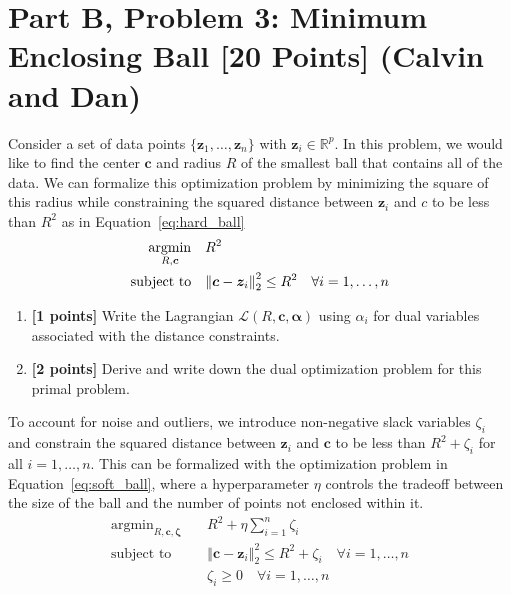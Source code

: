 \documentclass{article}
\DeclareMathOperator*{\argmin}{\mathrm{argmin}}
\def\R{\mathbb{R}}
\newcommand{\st}{\mathop{\mathrm{subject\,\,to}}}
\begin{document}
\section*{Part B, Problem 3: Minimum Enclosing Ball [20 Points] (Calvin and Dan)}

Consider a set of data points $\{\boldsymbol{z}_1,\dotsc,\boldsymbol{z}_n\}$ with $\boldsymbol{z}_i \in \R^p$. In this problem, we would like to find the center $\boldsymbol{c}$ and radius $R$ of the smallest ball that contains all of the data. We can formalize this optimization problem by minimizing the square of this radius while constraining the squared distance between $\boldsymbol{z}_i$ and $c$ to be less than $R^2$ as in Equation~\ref{eq:hard_ball}
\begin{align}
\argmin_{R,\boldsymbol{c}}&\quad R^{2} \nonumber \\ \st&\quad\norm{\boldsymbol{c}-\boldsymbol{z}_{i}}_{2}^{2}\leq R^{2}\quad \forall i=1,\dotsc,n \label{eq:hard_ball} 
\end{align}
\begin{enumerate}
\item \textbf{[1 points]} Write the Lagrangian $\mathcal{L}(R, \boldsymbol{c}, \boldsymbol{\alpha})$ using $\alpha_i$ for dual variables associated with the distance constraints.
\item \textbf{[2 points]} Derive and write down the dual optimization problem for this primal problem.
\end{enumerate}
 
To account for noise and outliers, we introduce non-negative slack variables $\zeta_i$ and constrain the squared distance between $\boldsymbol{z}_i$ and $\boldsymbol{c}$ to be less than $R^2 + \zeta_i$ for all $i=1,\dotsc,n$. This can be formalized with the optimization problem in Equation~\ref{eq:soft_ball}, where a hyperparameter $\eta$ controls the tradeoff between the size of the ball and the number of points not enclosed within it. 
\begin{align}
\argmin_{R,\boldsymbol{c},\boldsymbol{\zeta}}&\quad R^{2}+\eta \sum_{i=1}^{n} \zeta_i \nonumber \\ \st&\quad\left\Vert \boldsymbol{c}-\boldsymbol{z}_{i}\right\Vert _{2}^{2}\leq R^{2}+\zeta_{i}\quad \forall i=1,\dotsc,n \label{eq:soft_ball} \\
&\quad \zeta_{i}\geq0\quad \forall i=1,\dotsc,n \nonumber
\end{align}
\end{document}
